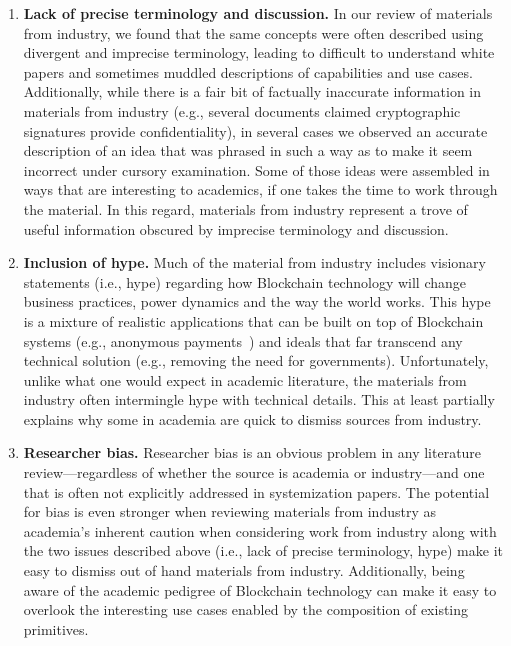 \begin{enumerate}
	\item \textbf{Lack of precise terminology and discussion.}
	In our review of materials from industry, we found that the same concepts were often described using divergent and imprecise terminology, leading to difficult to understand white papers and sometimes muddled descriptions of capabilities and use cases.
	Additionally, while there is a fair bit of factually inaccurate information in materials from industry (e.g., several documents claimed cryptographic signatures provide confidentiality), in several cases we  observed an accurate description of an idea that was phrased in such a way as to make it seem incorrect under cursory examination. Some of those ideas were assembled in ways that are interesting to academics, if one takes the time to work through the material.
	In this regard, materials from industry represent a trove of useful information obscured by imprecise terminology and discussion.
	
	\item \textbf{Inclusion of hype.}
	Much of the material from industry includes visionary statements (i.e., hype) regarding how Blockchain technology will change business practices, power dynamics and the way the world works.
	This hype is a mixture of realistic applications that can be built on top of Blockchain systems (e.g., anonymous payments~\cite{chaum1988untraceable}) and ideals that far transcend any technical solution (e.g., removing the need for governments).
	Unfortunately, unlike what one would expect in academic literature, the materials from industry often intermingle hype with technical details. This at least partially explains why some in academia are quick to dismiss sources from industry.
	
	\item \textbf{Researcher bias.}	
	Researcher bias is an obvious problem in any literature review---regardless of whether the source is academia or industry---and one that is often not explicitly addressed in systemization papers.
	The potential for bias is even stronger when reviewing materials from industry as academia's inherent caution when considering work from industry along with the two issues described above (i.e., lack of precise terminology, hype) make it easy to dismiss out of hand materials from industry.
	Additionally, being aware of the academic pedigree of Blockchain technology can make it easy to overlook the interesting use cases enabled by the composition of existing primitives.
	
\end{enumerate}


